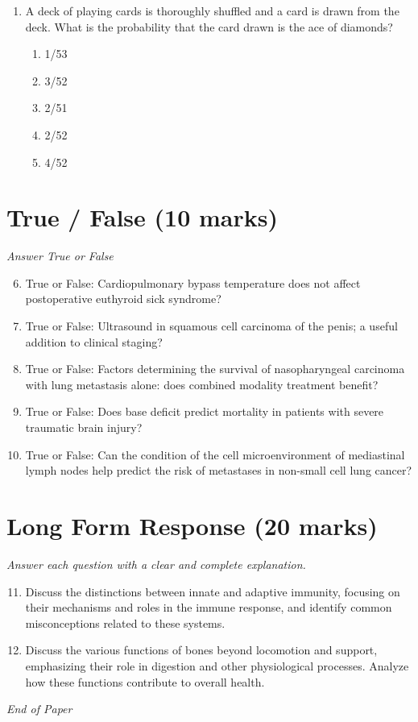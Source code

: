 \documentclass[12pt]{article}
\begin{document}
\begin{enumerate}[label=\arabic*.]
\begin{enumerate}[label=(\alph*)]
    \item Epidermal cell
    \item Stomatal guard cell
    \item Root cap cell
    \item Xylem vessel member
    \item Phloem sieve tube member
\end{enumerate}
\item A deck of playing cards is thoroughly shuffled and a card is drawn from the deck. What is the probability that the card drawn is the ace of diamonds?
\begin{enumerate}[label=(\alph*)]
    \item 1/53
    \item 3/52
    \item 2/51
    \item 2/52
    \item 4/52
\end{enumerate}
\end{enumerate}

\section*{True / False (10 marks)}
\textit{Answer True or False}
\begin{enumerate}[label=\arabic*.]
\setcounter{enumi}{5}
\item True or False: Cardiopulmonary bypass temperature does not affect postoperative euthyroid sick syndrome?
\item True or False: Ultrasound in squamous cell carcinoma of the penis; a useful addition to clinical staging?
\item True or False: Factors determining the survival of nasopharyngeal carcinoma with lung metastasis alone: does combined modality treatment benefit?
\item True or False: Does base deficit predict mortality in patients with severe traumatic brain injury?
\item True or False: Can the condition of the cell microenvironment of mediastinal lymph nodes help predict the risk of metastases in non-small cell lung cancer?
\end{enumerate}

\section*{Long Form Response (20 marks)}
\textit{Answer each question with a clear and complete explanation.}
\begin{enumerate}[label=\arabic*.]
\setcounter{enumi}{10}
\item Discuss the distinctions between innate and adaptive immunity, focusing on their mechanisms and roles in the immune response, and identify common misconceptions related to these systems.
\item Discuss the various functions of bones beyond locomotion and support, emphasizing their role in digestion and other physiological processes. Analyze how these functions contribute to overall health.
\end{enumerate}

\vfill
\noindent\textit{End of Paper}
\end{document}
